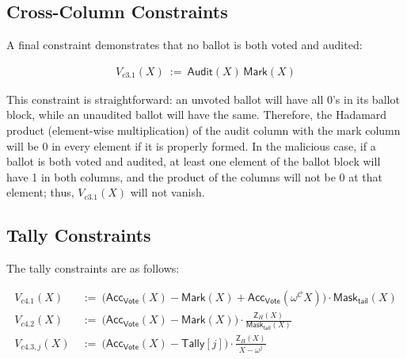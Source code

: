 \subsection{Cross-Column Constraints}


A final constraint demonstrates that no ballot is both voted and audited:

\begin{mdframed}[linewidth=0.6pt,backgroundcolor=verylightpink,innerleftmargin=6pt,innerrightmargin=6pt,innertopmargin=4pt,innerbottommargin=4pt]
\[
\begin{aligned}
V_{c3.1}(X)\ :=\ \mathsf{Audit}(X)\,\mathsf{Mark}(X)
\end{aligned}
\]
\end{mdframed}

 This constraint is straightforward: an unvoted ballot will have all 0's in its ballot block, while an unaudited ballot will have the same. Therefore, the Hadamard product (element-wise multiplication) of the audit column with the mark column will be 0 in every element if it is properly formed. In the malicious case, if a ballot is both voted and audited, at least one element of the ballot block will have 1 in both columns, and the product of the columns will not be 0 at that element; thus, $V_{c3.1}(X)$ will not vanish.


\subsection{Tally Constraints}
\label{sec:tally}

The tally constraints are as follows:

\begin{mdframed}[linewidth=0.6pt,backgroundcolor=verylightpink,innerleftmargin=6pt,innerrightmargin=6pt,innertopmargin=4pt,innerbottommargin=4pt]
\[
\begin{aligned}
V_{c4.1}(X)\ &:=\ \bigl(\mathsf{Acc}_{\mathsf{Vote}}(X)-\mathsf{Mark}(X)+\mathsf{Acc}_{\mathsf{Vote}}(\omega^{\mathcal{C}}X)\bigr)\cdot \mathsf{Mask}_{\mathsf{tail}}(X) \\
V_{c4.2}(X)\ &:=\ \bigl(\mathsf{Acc}_{\mathsf{Vote}}(X)-\mathsf{Mark}(X)\bigr)\cdot \frac{\mathsf{Z}_H(X)}{\mathsf{Mask}_{\mathsf{tail}}(X)}\\
V_{c4.3,j}(X)\ &:=\ \bigl(\mathsf{Acc}_{\mathsf{Vote}}(X)-\mathsf{Tally}[j]\bigr)\cdot \frac{\mathsf{Z}_H(X)}{X-\omega^{j}}
\end{aligned}
\]
\end{mdframed}

